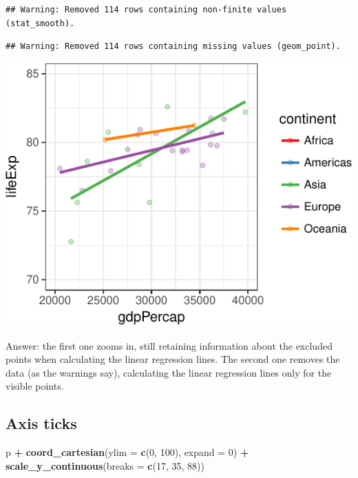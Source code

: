 \documentclass[12pt,]{krantz}
\makeatletter
\newenvironment{Shaded}{\begin{snugshade}}{\end{snugshade}}
\newcommand{\DataTypeTok}[1]{\textcolor[rgb]{0.13,0.29,0.53}{#1}}
\newcommand{\DecValTok}[1]{\textcolor[rgb]{0.00,0.00,0.81}{#1}}
\newcommand{\KeywordTok}[1]{\textcolor[rgb]{0.13,0.29,0.53}{\textbf{#1}}}
\newcommand{\NormalTok}[1]{#1}
\newcommand{\OperatorTok}[1]{\textcolor[rgb]{0.81,0.36,0.00}{\textbf{#1}}}
\newcommand{\StringTok}[1]{\textcolor[rgb]{0.31,0.60,0.02}{#1}}
\newenvironment{kframe}{%
\medskip{}
\setlength{\fboxsep}{.8em}
 \def\at@end@of@kframe{}%
 \ifinner\ifhmode%
  \def\at@end@of@kframe{\end{minipage}}%
  \begin{minipage}{\columnwidth}%
 \fi\fi%
 \def\FrameCommand##1{\hskip\@totalleftmargin \hskip-\fboxsep
 \colorbox{shadecolor}{##1}\hskip-\fboxsep
     \hskip-\linewidth \hskip-\@totalleftmargin \hskip\columnwidth}%
 \MakeFramed {\advance\hsize-\width
   \@totalleftmargin\z@ \linewidth\hsize
   \@setminipage}}%
 {\par\unskip\endMakeFramed%
 \at@end@of@kframe}
\renewenvironment{Shaded}{\begin{kframe}}{\end{kframe}}
\theoremstyle{definition}
\theoremstyle{definition}
\theoremstyle{definition}
\theoremstyle{remark}
\makeatother
\begin{document}
\begin{verbatim}
## Warning: Removed 114 rows containing non-finite values (stat_smooth).
\end{verbatim}

\begin{verbatim}
## Warning: Removed 114 rows containing missing values (geom_point).
\end{verbatim}

\includegraphics{05_fine_tuning_plots_files/figure-latex/unnamed-chunk-7-1.pdf}

Answer: the first one zooms in, still retaining information about the
excluded points when calculating the linear regression lines. The second
one removes the data (as the warnings say), calculating the linear
regression lines only for the visible points.

\hypertarget{axis-ticks}{%
\subsection{Axis ticks}\label{axis-ticks}}

\begin{Shaded}
\begin{Highlighting}[]
\NormalTok{p }\OperatorTok{+}
\StringTok{  }\KeywordTok{coord_cartesian}\NormalTok{(}\DataTypeTok{ylim =} \KeywordTok{c}\NormalTok{(}\DecValTok{0}\NormalTok{, }\DecValTok{100}\NormalTok{), }\DataTypeTok{expand =} \DecValTok{0}\NormalTok{) }\OperatorTok{+}
\StringTok{  }\KeywordTok{scale_y_continuous}\NormalTok{(}\DataTypeTok{breaks =} \KeywordTok{c}\NormalTok{(}\DecValTok{17}\NormalTok{, }\DecValTok{35}\NormalTok{, }\DecValTok{88}\NormalTok{))}
\end{Highlighting}
\end{Shaded}
\end{document}
